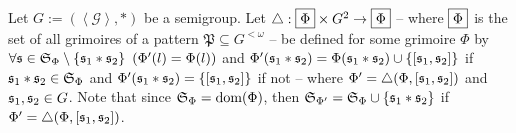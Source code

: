 \documentclass[12pt,b5paper]{article}
\begin{document}
Let \(G:=\left( \left\langle \mathscr{G} \right\rangle, * \right)\) be a semigroup. Let \(\triangle:\Phiset \times G^2 \to \Phiset\) -- where \(\Phiset\) is the set of all grimoires of a pattern \(\mathfrak{P} \subseteq G^{<\omega}\) -- be defined for some grimoire \(\Phi\) by \(\forall \mathfrak{s}\in \mathfrak{S}_{\Phi} \setminus\left\{ \mathfrak{s}_1*\mathfrak{s}_2 \right\}\ \left(\Phi'(l) = \Phi(l)\right)\) and \(\Phi'(\mathfrak{s}_1*\mathfrak{s}_2) = \Phi(\mathfrak{s}_1*\mathfrak{s}_2)\cup\left\{ \left[ \mathfrak{s}_1,\mathfrak{s}_2 \right] \right\}\) if \(\mathfrak{s}_1*\mathfrak{s}_2\in \mathfrak{S}_{\Phi}\) and \(\Phi'(\mathfrak{s}_1*\mathfrak{s}_2) = \left\{ \left[ \mathfrak{s}_1,\mathfrak{s}_2 \right] \right\}\) if not -- where \(\Phi' = \triangle(\Phi, \left[ \mathfrak{s}_1, \mathfrak{s}_2 \right])\) and \(\mathfrak{s}_1, \mathfrak{s}_2 \in G\). Note that since \(\mathfrak{S}_{\Phi}=\text{dom}(\Phi)\), then \(\mathfrak{S}_{\Phi'}=\mathfrak{S}_{\Phi}\cup\left\{ \mathfrak{s}_1*\mathfrak{s}_2 \right\}\) if \(\Phi' = \triangle(\Phi, \left[ \mathfrak{s}_1, \mathfrak{s}_2 \right])\).
\end{document}
